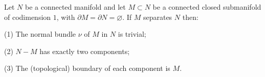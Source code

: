 Let $N$ be a connected manifold and let $M \subset N$ be a connected closed submanifold of codimension $1$, with $\partial M = \partial N = \varnothing$. If $M$ separates $N$ then:

(1) The normal bundle $\nu$ of $M$ in $N$ is trivial;

(2) $N - M$ has exactly two components;

(3) The (topological) boundary of each component is $M$.
